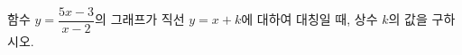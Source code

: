 \hspace*{2mm}\begin{minipage}[t]{\dimexpr\linewidth-2mm\relax}\vspace{0pt}
함수 $y=\dfrac{5x-3}{x-2}$의 그래프가 직선 $y=x+k$에 대하여 대칭일 때, 상수 $k$의 값을 구하시오.\end{minipage}

